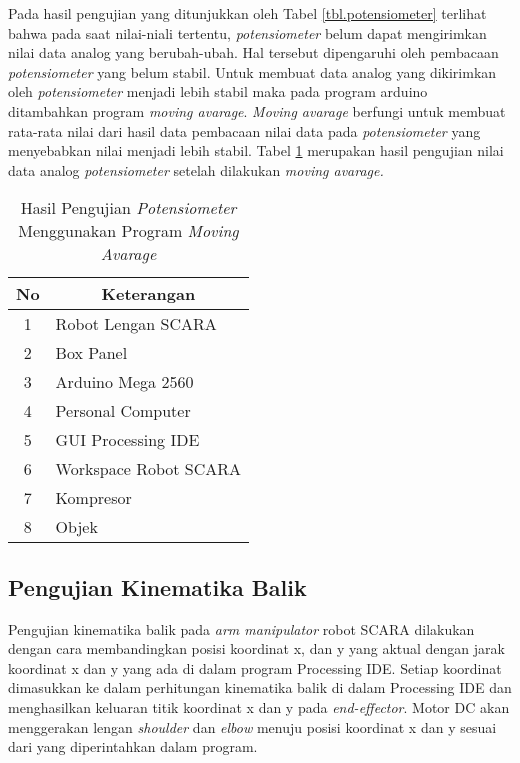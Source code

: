 Pada hasil pengujian yang ditunjukkan oleh Tabel \ref{tbl.potensiometer} terlihat bahwa pada saat nilai-niali tertentu, \textit{potensiometer} belum dapat mengirimkan nilai data analog yang berubah-ubah. Hal tersebut dipengaruhi oleh pembacaan \textit{potensiometer} yang belum stabil. Untuk membuat data analog yang dikirimkan oleh \textit{potensiometer} menjadi lebih stabil maka pada program arduino ditambahkan program \textit{moving avarage}. \textit{Moving avarage} berfungi untuk membuat rata-rata nilai dari hasil data pembacaan nilai data pada \textit{potensiometer} yang menyebabkan nilai menjadi lebih stabil. Tabel \ref{tbl.potensiometer2} merupakan hasil pengujian nilai data analog \textit{potensiometer} setelah dilakukan \textit{moving avarage.}

\begin{table}[H]
	\centering
	\caption{Hasil Pengujian \textit{Potensiometer} Menggunakan Program \textit{Moving Avarage}}
	\label{tbl.potensiometer2}
	\begin{tabular}{|c|l|}
		\hline
		\rowcolor[HTML]{9B9B9B} 
		
		No & \multicolumn{1}{c|}{\cellcolor[HTML]{9B9B9B}Keterangan} \\ \hline
		1  & Robot Lengan SCARA                                      \\ \hline
		2  & Box Panel                                               \\ \hline
		3  & Arduino Mega 2560                                       \\ \hline
		4  & Personal Computer                                       \\ \hline
		5  & GUI Processing IDE                                      \\ \hline
		6  & Workspace Robot SCARA                                   \\ \hline
		7  & Kompresor                                               \\ \hline
		8  & Objek                                                   \\ \hline
	\end{tabular}
	
\end{table} 

\subsection{Pengujian Kinematika Balik}
Pengujian kinematika balik pada \textit{arm manipulator} robot SCARA dilakukan dengan cara membandingkan posisi koordinat x, dan y yang aktual dengan jarak koordinat x dan y yang ada di dalam program Processing IDE. Setiap koordinat dimasukkan ke dalam perhitungan kinematika balik di dalam Processing IDE dan menghasilkan keluaran titik koordinat x dan y pada \textit{end-effector}. Motor DC akan menggerakan lengan \textit{shoulder} dan \textit{elbow} menuju posisi koordinat x dan y sesuai dari yang diperintahkan dalam program.

